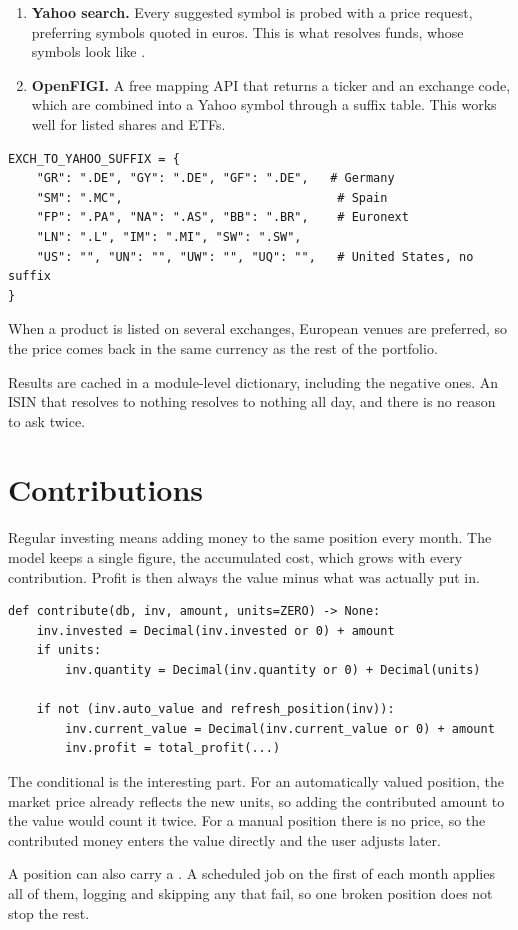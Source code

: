 \begin{enumerate}
  \item \textbf{Yahoo search.} Every suggested symbol is probed with a price
        request, preferring symbols quoted in euros. This is what resolves
        funds, whose symbols look like .
  \item \textbf{OpenFIGI.} A free mapping API that returns a ticker and an
        exchange code, which are combined into a Yahoo symbol through a suffix
        table. This works well for listed shares and ETFs.
\end{enumerate}

\begin{lstlisting}[style=py]
EXCH_TO_YAHOO_SUFFIX = {
    "GR": ".DE", "GY": ".DE", "GF": ".DE",   # Germany
    "SM": ".MC",                              # Spain
    "FP": ".PA", "NA": ".AS", "BB": ".BR",    # Euronext
    "LN": ".L", "IM": ".MI", "SW": ".SW",
    "US": "", "UN": "", "UW": "", "UQ": "",   # United States, no suffix
}
\end{lstlisting}

When a product is listed on several exchanges, European venues are preferred, so
the price comes back in the same currency as the rest of the portfolio.

Results are cached in a module-level dictionary, including the negative ones. An
ISIN that resolves to nothing resolves to nothing all day, and there is no reason
to ask twice.

\section{Contributions}

Regular investing means adding money to the same position every month. The model
keeps a single  figure, the accumulated cost, which grows with
every contribution. Profit is then always the value minus what was actually put
in.

\begin{lstlisting}[style=py]
def contribute(db, inv, amount, units=ZERO) -> None:
    inv.invested = Decimal(inv.invested or 0) + amount
    if units:
        inv.quantity = Decimal(inv.quantity or 0) + Decimal(units)

    if not (inv.auto_value and refresh_position(inv)):
        inv.current_value = Decimal(inv.current_value or 0) + amount
        inv.profit = total_profit(...)
\end{lstlisting}

The conditional is the interesting part. For an automatically valued position,
the market price already reflects the new units, so adding the contributed amount
to the value would count it twice. For a manual position there is no price, so
the contributed money enters the value directly and the user adjusts later.

A position can also carry a . A scheduled job on the
first of each month applies all of them, logging and skipping any that fail, so
one broken position does not stop the rest.
